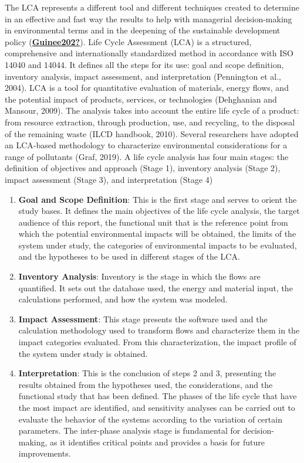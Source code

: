 \documentclass[]{elsarticle} %
\begin{document}
The LCA represents a different tool and different techniques created to determine in an effective and fast way the results to help with managerial decision-making in environmental terms and in the deepening of the sustainable development policy (\protect\hyperlink{ref-Guinee202}{\textbf{Guinee202?}}).
Life Cycle Assessment (LCA) is a structured, comprehensive and internationally standardized method in accordance with ISO 14040 and 14044.
It defines all the steps for its use: goal and scope definition, inventory analysis, impact assessment, and interpretation (Pennington et al., 2004).
LCA is a tool for quantitative evaluation of materials, energy flows, and the potential impact of products, services, or technologies (Dehghanian and Mansour, 2009).
The analysis takes into account the entire life cycle of a product: from resource extraction, through production, use, and recycling, to the disposal of the remaining waste (ILCD handbook, 2010). Several researchers have adopted an LCA-based methodology to characterize environmental considerations for a range of pollutants (Graf, 2019).
A life cycle analysis has four main stages: the definition of objectives and approach (Stage 1), inventory analysis (Stage 2), impact assessment (Stage 3), and interpretation (Stage 4)

\begin{enumerate}
\def\labelenumi{\arabic{enumi}.}
\item
  \textbf{Goal and Scope Definition}: This is the first stage and serves to orient the study bases. It defines the main objectives of the life cycle analysis, the target audience of this report, the functional unit that is the reference point from which the potential environmental impacts will be obtained, the limits of the system under study, the categories of environmental impacts to be evaluated, and the hypotheses to be used in different stages of the LCA.
\item
  \textbf{Inventory Analysis}: Inventory is the stage in which the flows are quantified. It sets out the database used, the energy and material input, the calculations performed, and how the system was modeled.
\item
  \textbf{Impact Assessment}: This stage presents the software used and the calculation methodology used to transform flows and characterize them in the impact categories evaluated. From this characterization, the impact profile of the system under study is obtained.
\item
  \textbf{Interpretation}: This is the conclusion of steps 2 and 3, presenting the results obtained from the hypotheses used, the considerations, and the functional study that has been defined. The phases of the life cycle that have the most impact are identified, and sensitivity analyses can be carried out to evaluate the behavior of the systems according to the variation of certain parameters. The inter-phase analysis stage is fundamental for decision-making, as it identifies critical points and provides a basis for future improvements.
\end{enumerate}
\end{document}

